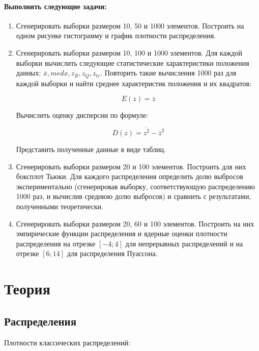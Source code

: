 \documentclass[a4paper,14pt]{article}
\begin{document}
	\paragraph{Выполнить следующие задачи:}
	\begin{enumerate}
		\item Сгенерировать выборки размером 10, 50 и 1000 элементов.
		Построить на одном рисунке гистограмму и график плотности распределения.
		
		\item Сгенерировать выборки размером 10, 100 и 1000 элементов.
		Для каждой выборки вычислить следующие статистические характеристики положения данных: $\overline{x}, med x, z_R, z_Q, z_{tr}$. Повторить такие вычисления 1000 раз для каждой выборки и найти среднее характеристик положения и их квадратов:
		
		\begin{equation}
			E(z)=\overline{z}
		\end{equation}
		
		Вычислить оценку дисперсии по формуле:
		
		\begin{equation}
			D(z)=\overline{z^2}-\overline{z}^2
		\end{equation}
		
		Представить полученные данные в виде таблиц.
		
		\item Сгенерировать выборки размером 20 и 100 элементов.
		\newline Построить для них боксплот Тьюки.
		Для каждого распределения определить долю выбросов экспериментально (сгенерировав выборку, соответствующую распределению 1000
		раз, и вычислив среднюю долю выбросов) и сравнить с результатами,
		полученными теоретически.
		
		\item Сгенерировать выборки размером 20, 60 и 100 элементов.
		Построить на них эмпирические функции распределения и ядерные оценки плотности распределения на отрезке $[-4; 4]$ для непрерывных распределений и на отрезке $[6; 14]$ для распределения Пуассона.
	\end{enumerate}
	\newpage
	\section{Теория}
	\subsection{Распределения}
	Плотности классических распределений:
	
\end{document}
